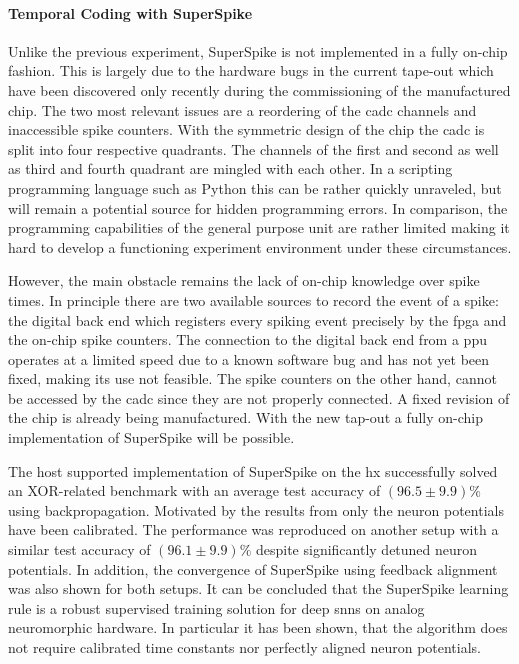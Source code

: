 \paragraph{Temporal Coding with SuperSpike} Unlike the previous experiment, SuperSpike is not implemented in a fully on-chip fashion. This is largely due to the hardware bugs in the current tape-out which have been discovered only recently during the commissioning of the manufactured chip. The two most relevant issues are a reordering of the \gls{cadc} channels and inaccessible spike counters. With the symmetric design of the chip the \gls{cadc} is split into four respective quadrants. The channels of the first and second as well as third and fourth quadrant are mingled with each other. In a scripting programming language such as Python this can be rather quickly unraveled, but will remain a potential source for hidden programming errors. In comparison, the programming capabilities of the general purpose unit are rather limited making it hard to develop a functioning experiment environment under these circumstances. 

However, the main obstacle remains the lack of on-chip knowledge over spike times. In principle there are two available sources to record the event of a spike: the digital back end which registers every spiking event precisely by the \gls{fpga} and the on-chip spike counters. The connection to the digital back end from a \gls{ppu} operates at a limited speed due to a known software bug and has not yet been fixed, making its use not feasible. The spike counters on the other hand, cannot be accessed by the \gls{cadc} since they are not properly connected. A fixed revision of the chip is already being manufactured. With the new tap-out a fully on-chip implementation of SuperSpike will be possible. 


The host supported implementation of SuperSpike on the \gls{hx} successfully solved an XOR-related benchmark with an average test accuracy of $(96.5 \pm 9.9) \%$ using backpropagation. Motivated by the results from \cite{wunderlich2019advantages} only the neuron potentials have been calibrated. The performance was reproduced on another setup with a similar test accuracy of $(96.1 \pm 9.9) \%$ despite significantly detuned neuron potentials. In addition, the convergence of SuperSpike using feedback alignment was also shown for both setups. It can be concluded that the SuperSpike learning rule is a robust supervised training solution for deep \glspl{snn} on analog neuromorphic hardware. In particular it has been shown, that the algorithm does not require calibrated time constants nor perfectly aligned neuron potentials.

